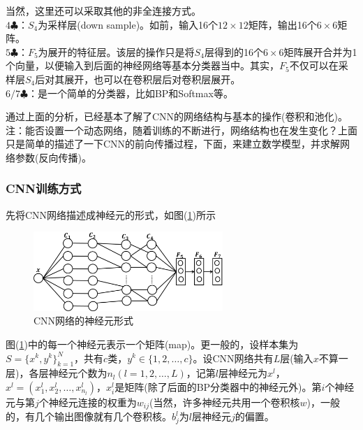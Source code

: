             当然，这里还可以采取其他的非全连接方式。\\
            $4\clubsuit$：$S_4$为采样层(down sample)。如前，输入16个$12\times 12$矩阵，输出16个$6\times 6$矩阵。\\
            $5\clubsuit$：$F_5$为展开的特征层。该层的操作只是将$S_4$层得到的16个$6\times 6$矩阵展开合并为1个向量，以便输入到后面的神经网络等基本分类器当中。其实，$F_5$不仅可以在采样层$S_4$后对其展开，也可以在卷积层后对卷积层展开。\\
            $6/7\clubsuit$：是一个简单的分类器，比如BP和Softmax等。
            \par
            通过上面的分析，已经基本了解了CNN的网络结构与基本的操作(卷积和池化)。注：能否设置一个动态网络，随着训练的不断进行，网络结构也在发生变化？上面只是简单的描述了一下CNN的前向传播过程，下面，来建立数学模型，并求解网络参数(反向传播)。
        \subsubsection{CNN训练方式}
            \par
            先将CNN网络描述成神经元的形式，如图(\ref{fig:CNN网络的神经元形式})所示
            \begin{figure}[H]
            \centering
            \includegraphics[height=3cm]{images/CNN_neural_form_of_the_network.jpg}
            \caption{CNN网络的神经元形式}
            \label{fig:CNN网络的神经元形式}
            \end{figure}
            图(\ref{fig:CNN网络的神经元形式})中的每一个神经元表示一个矩阵(map)。更一般的，设样本集为$S = \{x^k,y^k\}_{k=1}^N $，共有$c$类，$y^k \in \{1,2,\dots,c\}$。设CNN网络共有$L$层(输入$x$不算一层)，各层神经元个数为$n_l(l=1,2,\dots,L)$，记第$l$层神经元为$x^l$，$x^l = (x_1^l,x_2^l,\dots,x_{n_l}^l)$，$x_i^l$是矩阵(除了后面的BP分类器中的神经元外)。第$i$个神经元与第$j$个神经元连接的权重为$w_{ij}$(当然，许多神经元共用一个卷积核$w$)，一般的，有几个输出图像就有几个卷积核。$b_j^l$为$l$层神经元$j$的偏置。
